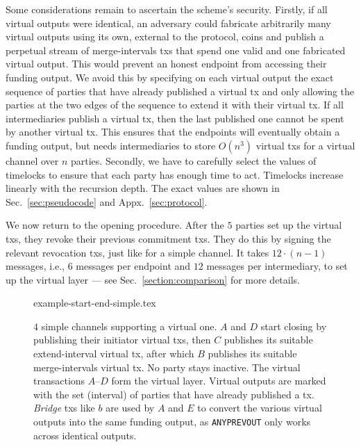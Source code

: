  Some considerations remain to ascertain the scheme's security.
  Firstly, if all virtual outputs
  were identical, an adversary could fabricate arbitrarily many virtual outputs using
  its own, external to the protocol, coins and publish a perpetual stream of
  merge-intervals txs that spend one valid and one fabricated virtual output.
  This would prevent an honest endpoint from accessing their funding output.
  We avoid this by
  specifying on each virtual output the exact sequence of parties that have
  already published a virtual tx and only allowing the parties at the two edges
  of the sequence
  to extend it with their virtual tx. If all intermediaries publish a virtual
  tx, then the last published one cannot be spent by
  another virtual
  tx. This ensures that the endpoints will eventually obtain a funding
  output, but needs intermediaries to store
  $O(n^3)$ virtual txs for a virtual channel over $n$ parties. Secondly,
  we have to carefully select the values of timelocks to ensure that
  each party has enough time to act. Timelocks increase linearly
  with the recursion depth. The exact values are shown in
  Sec.~\ref{sec:pseudocode} and Appx.~\ref{sec:protocol}.

  We now return to the opening procedure. After the $5$ parties set up the virtual txs, they revoke their previous
  commitment
  txs. They do this by signing the relevant revocation txs, just like
  for a simple channel. It takes $12 \cdot (n-1)$ messages, i.e., $6$ messages
  per endpoint and $12$ messages per intermediary, to set up the virtual layer
  --- see Sec.~\ref{section:comparison} for more details.

  \addtolength{\intextsep}{-15pt}
  \begin{figure*}
    \centering
    {example-start-end-simple.tex}
    \caption{$4$ simple channels supporting a virtual one. $A$ and $D$ start
    closing by publishing their initiator virtual txs, then $C$ publishes its
    suitable extend-interval virtual tx, after which $B$ publishes its suitable
    merge-intervals virtual tx. No party stays inactive. The virtual
    transactions $A$--$D$ form the virtual layer. Virtual outputs are marked
    with the set (interval) of parties that have already published a tx.
    \emph{Bridge} txs like $b$ are used by $A$ and $E$ to convert the various
    virtual outputs into the same funding output, as \texttt{ANYPREVOUT} only
    works across identical outputs.}
    \label{figure:example-start-end-simple}
  \end{figure*}
  \addtolength{\intextsep}{15pt}

